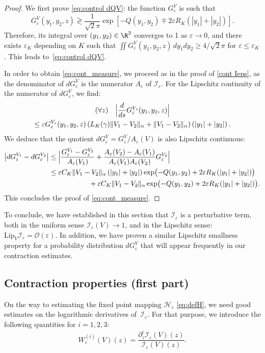 \documentclass[10pt]{amsart}
\let\mathcal\mathscr
\newcommand{\cI}{\mathcal{I}}
\newcommand{\cO}{\mathcal{O}}
\theoremstyle{plain}
\theoremstyle{definition}
\renewcommand{\H}{\mathcal{H}_\eps}
\let\eps\varepsilon
\newcommand{\abs}[1]{\left\lvert#1\right\rvert}
\newcommand{\Babs}[1]{\Bigl\lvert#1\Bigr\rvert}
\newcommand{\QV}{G_\eps^V}
\newcommand{\dQVA}{dG_\eps^{V_1}}
\newcommand{\dQVB}{dG_\eps^{V_2}}
\newcommand{\Cgamma}{L_K(\gamma)}
\begin{document}
\begin{proof}
We first prove \eqref{eq:control dQV}: the function $\QV$ is such that
\begin{equation*}
\QV(y_1,y_2,z) \gtrless \dfrac1{\sqrt{2}\pi} \exp\left[-Q(y_1,y_2) \mp 2 \eps R_K (\abs{y_1}+\abs{y_2}) \right].
\end{equation*}
Therefore, its integral over $(y_1,y_2)\in \R^2$ converges to 1 as $\eps\to 0$, and there exists $\eps_K$ depending on $K$ such that $\iint \QV(y_1,y_2,z)\,dy_1 dy_2 \geq 4/{\sqrt{2}\pi}$ for $\eps \leq \eps_K$. This leads to~\eqref{eq:control dQV}.

In order to obtain \eqref{eq:cont_measure}, we proceed as in the proof of \cref{cont Ieps}, as the denominator of $d\QV$ is the numerator $A_\eps$ of $\cI_\eps$. For the Lipschitz continuity of the numerator of $d\QV$, we find:
\begin{multline*}
(\forall z)\quad \Bigl | \dfrac{d}{ds} G_\eps^{V_s}(y_1,y_2,z) \Bigr |\\ \leq \eps G_\eps^{V_s} (y_1,y_2, z) \left (\Cgamma \| V_1 - V_2\|_\alpha + \| V_1 - V_2\|_\alpha \right) \left (|y_1| + |y_2|\right).
\end{multline*}
We deduce that the quotient $d\QV =\QV/{A_\eps(V)}$ is also Lipschitz continuous:
\begin{align*}
\abs{\dQVA - \dQVB} &\leq \Babs{\dfrac{G_\eps^{V_1} - G_\eps^{V_2}}{A_\eps(V_1)} + \dfrac{A_\eps(V_2) - A_\eps(V_1)}{A_\eps(V_1)A_\eps(V_2)} G_\eps^{V_2}}\\
& \leq \eps C_K\| V_1 - V_2\|_\alpha \left (|y_1| + |y_2|\right) \exp \bigl(-Q(y_1,y_2) + 2 \eps R_K(\abs{y_1}+\abs{y_2}) \bigr)\\
& \hspace*{2cm} + \eps C_K \| V_1 - V_2\|_\alpha \exp \bigl(-Q(y_1,y_2) + 2 \eps R_K (\abs{y_1}+\abs{y_2}) \bigr).
\end{align*}
This concludes the proof of \eqref{eq:cont_measure}.
\end{proof}

To conclude, we have established in this section that $\cI_\eps$ is a perturbative term, both in the uniform sense $\cI_\eps (V) \to 1$, and in the Lipschitz sense: $\mathrm{Lip}_V \cI_\eps = \cO(\eps)$. In addition, we have proven a similar Lipschitz smallness property for a probability distribution $d\QV$ that will appear frequently in our contraction estimates.

\subsection{Contraction properties (first part)}\label{sec a priori estimates}
On the way to estimating the fixed point mapping $\H$ \eqref{eq:defH}, we need good estimates on the logarithmic derivatives of~$\cI_\eps$. For that purpose, we introduce the following quantities for $i =1,2,3$:
\begin{equation}\label{def:W}
W^{(i)}_\eps (V) (z)= \dfrac{\partial_z^i \cI_\eps(V)(z)}{\cI_\eps(V)(z)}.
\end{equation}
\end{document}
